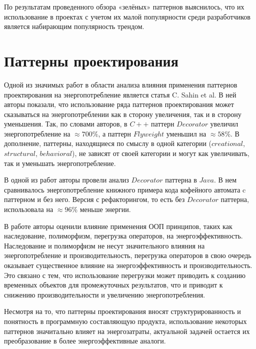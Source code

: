 \documentclass{math-mech-sci}
\begin{document}
        По результатам проведенного обзора «зелёных» паттернов выяснилось, что их использование в проектах с учетом их малой популярности среди разработчиков является набирающим популярность трендом.



\section{Паттерны проектирования}
        Одной из значимых работ в области анализа влияния применения паттернов проектирования на энергопотребление является статья \cite{6224257} C. Sahin et al. В ней авторы показали, что использование ряда паттернов проектирования может сказываться на энергопотреблении как в сторону увеличения, так и в сторону уменьшения. Так, по словами авторов, в \(C++\) паттерн \(Decorator\) увеличил энергопотребление на \(\approx700\%\), а паттерн \(Flyweight\) уменьшил на \(\approx58\%\). В дополнение, паттерны, находящиеся по смыслу в одной категории (\(creational\), \(structural\), \(behavioral\)), не зависят от своей категории и могут как увеличивать, так и уменьшать энергопотребление.

        В одной из работ \cite{9825873} авторы провели анализ \(Decorator\) паттерна в \(Java\). В нем сравнивалось энергопотребление книжного примера кода кофейного автомата c паттерном и без него. Версия с рефакторингом, то есть без \(Decorator\) паттерна, использовала на \(\approx96\%\) меньше энергии.

        В работе \cite{8323605} авторы оценили влияние применения ООП принципов, таких как наследование, полиморфизм, перегрузка операторов, на энергоэффективность. Наследование и полиморфизм не несут значительного влияния на энергопотребление и производительность, перегрузка операторов в свою очередь оказывает существенное влияние на энергоэффективность и производительность. Это связано с тем, что использование перегрузки может приводить к созданию временных объектов для промежуточных результатов, что и приводит к снижению производительности и увеличению энергопотребления.

        Несмотря на то, что паттерны проектирования вносят структурированность и понятность в программную составляющую продукта, использование некоторых паттернов значитально влияет на энергозатраты, актуальной задачей остается их преобразование в более энергоэффективные аналоги.
\end{document}
